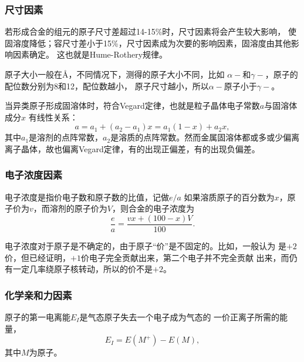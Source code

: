             \subsubsection{尺寸因素}
                若形成合金的组元的原子尺寸差超过14-15\%时，尺寸因素将会产生较大影响，
                使固溶度降低；容尺寸差小于15\%，尺寸因素成为次要的影响因素，固溶度由其他影响因素确定。
                这也就是Hume-Rothery规律。

                原子大小一般在\si{\angstrom}，不同情况下，测得的原子大小不同，比如
                $\alpha-$和$\gamma-$，原子的配位数分别为8和12，配位数越小，
                原子尺寸越小，所以$\alpha-$原子小于$\gamma-$。

                当异类原子形成固溶体时，符合Vegard定律，也就是粒子晶体电子常数$a$与固溶体成分$x$
                有线性关系：
                \begin{equation}
                    a=a_1+(a_2-a_1)x=a_1(1-x)+a_2x,
                \end{equation}
                其中$a_1$是溶剂的点阵常数，$a_2$是溶质的点阵常数。然而金属固溶体都或多或少偏离
                离子晶体，故也偏离Vegard定律，有的出现正偏差，有的出现负偏差。
            \subsubsection{电子浓度因素}
                电子浓度是指价电子数和原子数的比值，记做$e/a$
                如果溶质原子的百分数为$x$，原子价为$v$，而溶剂的原子价为$V$，则合金的电子浓度为
                \begin{equation}
                    \frac{e}{a}=\frac{v x+(100-x) V}{100}.
                \end{equation}

                电子浓度对于原子是不确定的，由于原子“价”是不固定的。比如，一般认为
                是$+2$价，但已经证明，$+1$价电子完全贡献出来，第二个电子并不完全贡献
                出来，而仍有一定几率绕原子核转动，所以的价不是$+2$。
            \subsubsection{化学亲和力因素}
                原子的第一电离能$E_I$是气态原子失去一个电子成为气态的
                一价正离子所需的能量，
                \begin{equation}
                    E_I=E(M^+)-E(M),
                \end{equation}
                其中$M$为原子。

